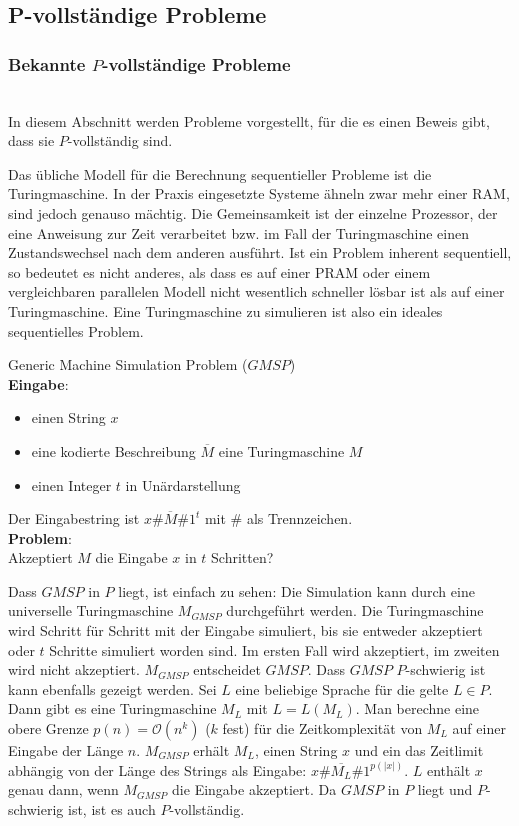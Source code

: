 \subsection{P-vollständige Probleme}

\subsubsection{Bekannte $P$-vollständige Probleme} \hfill \\
In diesem Abschnitt werden Probleme vorgestellt, für die es einen Beweis gibt,
dass sie $P$-vollständig sind.

Das übliche Modell für die Berechnung sequentieller Probleme ist die
Turingmaschine.
In der Praxis eingesetzte Systeme ähneln zwar mehr einer RAM, sind jedoch
genauso mächtig.
Die Gemeinsamkeit ist der einzelne Prozessor, der eine Anweisung zur Zeit
verarbeitet bzw. im Fall der Turingmaschine einen Zustandswechsel nach dem
anderen ausführt.
Ist ein Problem inherent sequentiell, so bedeutet es nicht anderes, als dass es
auf einer PRAM oder einem vergleichbaren parallelen Modell nicht wesentlich
schneller lösbar ist als auf einer Turingmaschine.
Eine Turingmaschine zu simulieren ist also ein ideales sequentielles Problem.

\begin{problem}
    Generic Machine Simulation Problem ($GMSP$) \\
    \textbf{Eingabe}:
    \begin{itemize}
        \item einen String $x$
        \item eine kodierte Beschreibung $\overline{M}$ eine Turingmaschine $M$
        \item einen Integer $t$ in Unärdarstellung
    \end{itemize}
    Der Eingabestring ist $x\#\overline{M}\#1^t$ mit $\#$ als Trennzeichen. \\
    \textbf{Problem}: \\
    Akzeptiert $M$ die Eingabe $x$ in $t$ Schritten?
    \cite[S.215]{greenlaw}
\end{problem}
Dass $GMSP$ in $P$ liegt, ist einfach zu sehen:
Die Simulation kann durch eine universelle Turingmaschine $M_{GMSP}$
durchgeführt werden.
Die Turingmaschine wird Schritt für Schritt mit der Eingabe simuliert, bis sie
entweder akzeptiert oder $t$ Schritte simuliert worden sind.
Im ersten Fall wird akzeptiert, im zweiten wird nicht akzeptiert.
$M_{GMSP}$ entscheidet $GMSP$.
Dass $GMSP$ $P$-schwierig ist kann ebenfalls gezeigt werden.
Sei $L$ eine beliebige Sprache für die gelte $L \in P$.
Dann gibt es eine Turingmaschine $M_L$ mit $L = L(M_L)$.
Man berechne eine obere Grenze $p(n) = \mathcal{O}(n^k)$ ($k$ fest) für die
Zeitkomplexität von $M_L$ auf einer Eingabe der Länge $n$.
$M_{GMSP}$ erhält $M_L$, einen String $x$ und ein das Zeitlimit abhängig von der
Länge des Strings als Eingabe: $x\#\overline{M_L}\#1^{p(|x|)}$.
$L$ enthält $x$ genau dann, wenn $M_{GMSP}$ die Eingabe akzeptiert.
Da $GMSP$ in $P$ liegt und $P$-schwierig ist, ist es auch $P$-vollständig.
\cite[S.57ff]{greenlaw}


